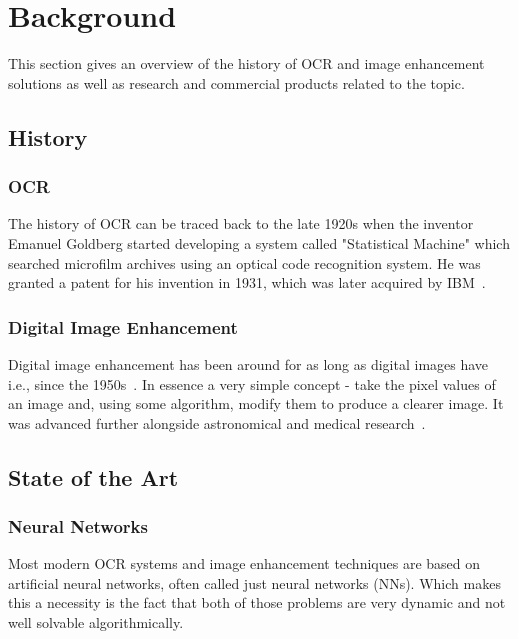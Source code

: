 \documentclass[12pt]{article}
\begin{document}
\newpage
\section{Background}

This section gives an overview of the history of OCR and image enhancement solutions as well as research and commercial products related to the topic.

\subsection{History}

\subsubsection{OCR}

The history of OCR can be traced back to the late 1920s when the inventor Emanuel Goldberg started developing a system called "Statistical Machine" which searched microfilm archives using an optical code recognition system. He was granted a patent for his invention in 1931, which was later acquired by IBM~\cite{1838389}.

\subsubsection{Digital Image Enhancement}

Digital image enhancement has been around for as long as digital images have i.e., since the 1950s~\cite{dipanniversary}. In essence a very simple concept - take the pixel values of an image and, using some algorithm, modify them to produce a clearer image. It was advanced further alongside astronomical and medical research~\cite{Rosenfeld}.

\subsection{State of the Art}

\subsubsection{Neural Networks}

Most modern OCR systems and image enhancement techniques are based on artificial neural networks, often called just neural networks (NNs). Which makes this a necessity is the fact that both of those problems are very dynamic and not well solvable algorithmically.
\end{document}
